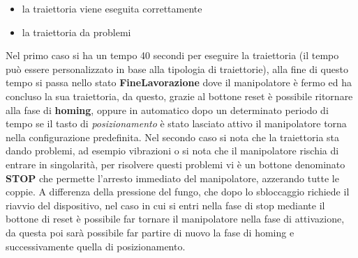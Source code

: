 \begin{itemize}
	\item la traiettoria viene eseguita correttamente
	\item la traiettoria da problemi
\end{itemize}
Nel primo caso si ha un tempo 40 secondi per eseguire la traiettoria (il tempo può essere personalizzato in base alla tipologia di traiettorie), alla fine di questo tempo si passa nello stato \textbf{FineLavorazione} dove il manipolatore è fermo ed ha concluso la sua traiettoria, da questo, grazie al bottone reset è possibile ritornare alla fase di \textbf{homing}, oppure in automatico dopo un determinato periodo di tempo se il tasto di \textit{posizionamento} è stato lasciato attivo il manipolatore torna nella configurazione predefinita. Nel secondo caso si nota che la traiettoria sta dando problemi, ad esempio vibrazioni o si nota che il manipolatore rischia di entrare in singolarità, per risolvere questi problemi vi è un bottone denominato \textbf{STOP} che permette l'arresto immediato del manipolatore, azzerando tutte le coppie. A differenza della pressione del fungo, che dopo lo sbloccaggio richiede il riavvio del dispositivo, nel caso in cui si entri nella fase di stop mediante il bottone di reset è possibile far tornare il manipolatore nella fase di attivazione, da questa poi sarà possibile far partire di nuovo la fase di homing e successivamente quella di posizionamento.
